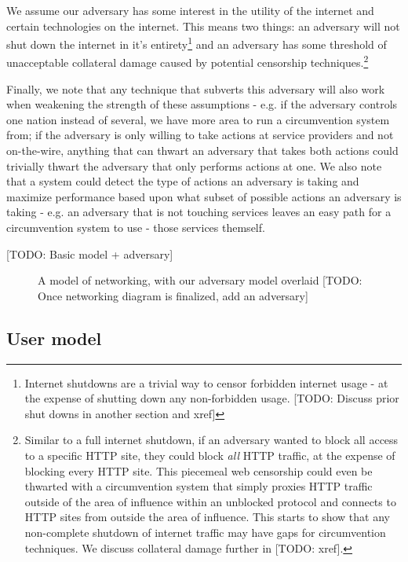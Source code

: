 \documentclass[12pt]{report}
\begin{document}
We assume our adversary has some interest in the utility of the internet and certain technologies on the internet. This means two things: an adversary will not shut down the internet in it's entirety\footnote{Internet shutdowns are a trivial way to censor forbidden internet usage - at the expense of shutting down any non-forbidden usage. [TODO: Discuss prior shut downs in another section and xref]} and an adversary has some threshold of unacceptable collateral damage caused by potential censorship techniques.\footnote{Similar to a full internet shutdown, if an adversary wanted to block all access to a specific HTTP site, they could block \emph{all} HTTP traffic, at the expense of blocking every HTTP site. This piecemeal web censorship could even be thwarted with a circumvention system that simply proxies HTTP traffic outside of the area of influence within an unblocked protocol and connects to HTTP sites from outside the area of influence. This starts to show that any non-complete shutdown of internet traffic may have gaps for circumvention techniques. We discuss collateral damage further in [TODO: xref].}

Finally, we note that any technique that subverts this adversary will also work when weakening the strength of these assumptions - e.g. if the adversary controls one nation instead of several, we have more area to run a circumvention system from; if the adversary is only willing to take actions at service providers and not on-the-wire, anything that can thwart an adversary that takes both actions could trivially thwart the adversary that only performs actions at one. We also note that a system could detect the type of actions an adversary is taking and maximize performance based upon what subset of possible actions an adversary is taking - e.g. an adversary that is not touching services leaves an easy path for a circumvention system to use - those services themself.

[TODO: Basic model + adversary]

\begin{figure}
\begin{center}
{}
\end{center}
\caption[Basic networking, with an adversary]{A model of networking, with our adversary model overlaid [TODO: Once networking diagram is finalized, add an adversary]}
\end{figure}

\subsection{User model}
\end{document}
